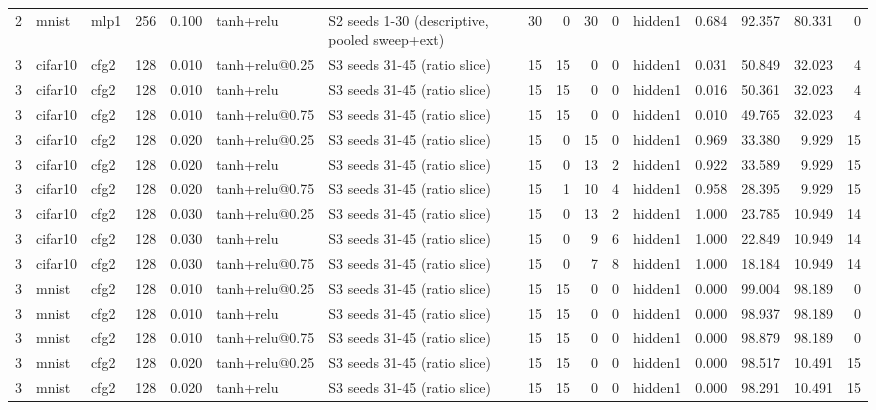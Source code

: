 \begin{table}[htbp]
{\begin{tabular}{@{}rllrrllrrrrlrrrr@{}}
2 & mnist & mlp1 & 256 & 0.100 & tanh+relu & S2 seeds 1-30 (descriptive, pooled sweep+ext) & 30 & 0 & 30 & 0 & hidden1 & 0.684 & 92.357 & 80.331 & 0 \\
3 & cifar10 & cfg2 & 128 & 0.010 & tanh+relu@0.25 & S3 seeds 31-45 (ratio slice) & 15 & 15 & 0 & 0 & hidden1 & 0.031 & 50.849 & 32.023 & 4 \\
3 & cifar10 & cfg2 & 128 & 0.010 & tanh+relu & S3 seeds 31-45 (ratio slice) & 15 & 15 & 0 & 0 & hidden1 & 0.016 & 50.361 & 32.023 & 4 \\
3 & cifar10 & cfg2 & 128 & 0.010 & tanh+relu@0.75 & S3 seeds 31-45 (ratio slice) & 15 & 15 & 0 & 0 & hidden1 & 0.010 & 49.765 & 32.023 & 4 \\
3 & cifar10 & cfg2 & 128 & 0.020 & tanh+relu@0.25 & S3 seeds 31-45 (ratio slice) & 15 & 0 & 15 & 0 & hidden1 & 0.969 & 33.380 & 9.929 & 15 \\
3 & cifar10 & cfg2 & 128 & 0.020 & tanh+relu & S3 seeds 31-45 (ratio slice) & 15 & 0 & 13 & 2 & hidden1 & 0.922 & 33.589 & 9.929 & 15 \\
3 & cifar10 & cfg2 & 128 & 0.020 & tanh+relu@0.75 & S3 seeds 31-45 (ratio slice) & 15 & 1 & 10 & 4 & hidden1 & 0.958 & 28.395 & 9.929 & 15 \\
3 & cifar10 & cfg2 & 128 & 0.030 & tanh+relu@0.25 & S3 seeds 31-45 (ratio slice) & 15 & 0 & 13 & 2 & hidden1 & 1.000 & 23.785 & 10.949 & 14 \\
3 & cifar10 & cfg2 & 128 & 0.030 & tanh+relu & S3 seeds 31-45 (ratio slice) & 15 & 0 & 9 & 6 & hidden1 & 1.000 & 22.849 & 10.949 & 14 \\
3 & cifar10 & cfg2 & 128 & 0.030 & tanh+relu@0.75 & S3 seeds 31-45 (ratio slice) & 15 & 0 & 7 & 8 & hidden1 & 1.000 & 18.184 & 10.949 & 14 \\
3 & mnist & cfg2 & 128 & 0.010 & tanh+relu@0.25 & S3 seeds 31-45 (ratio slice) & 15 & 15 & 0 & 0 & hidden1 & 0.000 & 99.004 & 98.189 & 0 \\
3 & mnist & cfg2 & 128 & 0.010 & tanh+relu & S3 seeds 31-45 (ratio slice) & 15 & 15 & 0 & 0 & hidden1 & 0.000 & 98.937 & 98.189 & 0 \\
3 & mnist & cfg2 & 128 & 0.010 & tanh+relu@0.75 & S3 seeds 31-45 (ratio slice) & 15 & 15 & 0 & 0 & hidden1 & 0.000 & 98.879 & 98.189 & 0 \\
3 & mnist & cfg2 & 128 & 0.020 & tanh+relu@0.25 & S3 seeds 31-45 (ratio slice) & 15 & 15 & 0 & 0 & hidden1 & 0.000 & 98.517 & 10.491 & 15 \\
3 & mnist & cfg2 & 128 & 0.020 & tanh+relu & S3 seeds 31-45 (ratio slice) & 15 & 15 & 0 & 0 & hidden1 & 0.000 & 98.291 & 10.491 & 15 \\

\end{tabular}}
\end{table}
